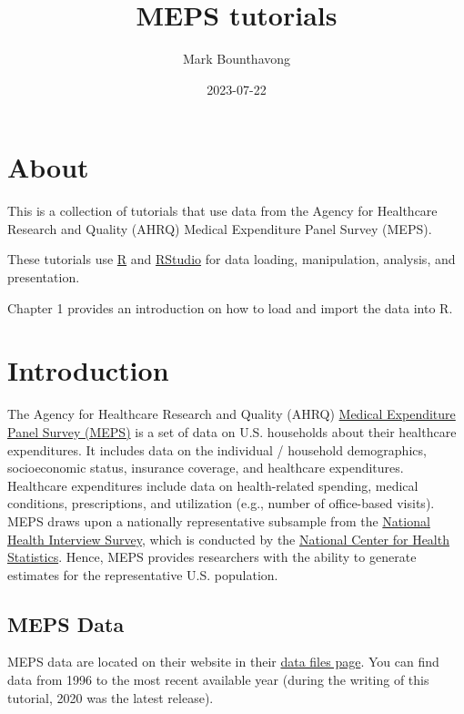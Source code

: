 \documentclass[
]{book}
\title{MEPS tutorials}
\author{Mark Bounthavong}
\date{2023-07-22}
\theoremstyle{definition}
\theoremstyle{definition}
\theoremstyle{definition}
\theoremstyle{definition}
\theoremstyle{remark}
\begin{document}
\maketitle

{
\setcounter{tocdepth}{1}
\tableofcontents
}
\hypertarget{about}{%
\chapter*{About}\label{about}}

This is a collection of tutorials that use data from the Agency for Healthcare Research and Quality (AHRQ) Medical Expenditure Panel Survey (MEPS).

These tutorials use \href{https://cran.r-project.org/}{R} and \href{https://posit.co/products/open-source/rstudio/}{RStudio} for data loading, manipulation, analysis, and presentation.

Chapter 1 provides an introduction on how to load and import the data into R.

\hypertarget{introduction}{%
\chapter{Introduction}\label{introduction}}

The Agency for Healthcare Research and Quality (AHRQ) \href{https://www.meps.ahrq.gov/mepsweb/}{Medical Expenditure Panel Survey (MEPS)} is a set of data on U.S. households about their healthcare expenditures. It includes data on the individual / household demographics, socioeconomic status, insurance coverage, and healthcare expenditures. Healthcare expenditures include data on health-related spending, medical conditions, prescriptions, and utilization (e.g., number of office-based visits). MEPS draws upon a nationally representative subsample from the \href{https://www.cdc.gov/nchs/nhis/index.htm?CDC_AA_refVal=https\%3A\%2F\%2Fwww.cdc.gov\%2Fnchs\%2Fnhis.htm}{National Health Interview Survey}, which is conducted by the \href{https://www.cdc.gov/nchs/index.htm}{National Center for Health Statistics}. Hence, MEPS provides researchers with the ability to generate estimates for the representative U.S. population.

\hypertarget{meps-data}{%
\section{MEPS Data}\label{meps-data}}

MEPS data are located on their website in their \href{https://www.meps.ahrq.gov/mepsweb/data_stats/download_data_files.jsp}{data files page}. You can find data from 1996 to the most recent available year (during the writing of this tutorial, 2020 was the latest release).
\end{document}

